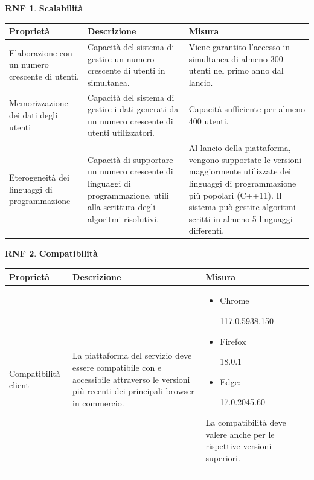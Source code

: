 \documentclass[11pt, a4paper]{article}
\theoremstyle{definition} %
\newtheorem{nonfuncreq}{RNF} %
\begin{document}
\begin{nonfuncreq}
\textbf{Scalabilità }
\begin{center}
    \footnotesize
    \begin{tabularx}{\textwidth}{|X||X||X|}
        \hline
        \cellcolor{red!70}Proprietà & \cellcolor{red!70}Descrizione & \cellcolor{red!70}Misura\\
        \hline
        Elaborazione con un numero crescente di utenti. & Capacità del sistema di gestire un numero crescente di utenti in simultanea. & Viene garantito l'accesso in simultanea di almeno 300 utenti nel primo anno dal lancio.\\
        \hline
        Memorizzazione dei dati degli utenti & Capacità del sistema di gestire i dati generati da un numero crescente di utenti utilizzatori. & Capacità sufficiente per almeno 400 utenti.\\
        \hline
        Eterogeneità dei linguaggi di programmazione & Capacità di supportare un numero crescente di linguaggi di programmazione, utili alla scrittura degli algoritmi risolutivi. & Al lancio della piattaforma, vengono supportate le versioni maggiormente utilizzate dei linguaggi di programmazione più popolari (C++11). Il sistema può gestire algoritmi scritti in almeno 5 linguaggi differenti.\\
        \hline
    \end{tabularx}
\end{center}
\end{nonfuncreq}

\begin{nonfuncreq}
    \textbf{Compatibilità }
    \begin{center}
        \footnotesize
        \begin{tabularx}{\textwidth}{|X||X||X|}
            \hline
            \cellcolor{red!70}Proprietà & \cellcolor{red!70}Descrizione & \cellcolor{red!70}Misura\\
            \hline
            Compatibilità client & La piattaforma del servizio deve essere compatibile con e accessibile attraverso le versioni più recenti dei principali browser in commercio. &
            \begin{itemize}
                \item Chrome

                117.0.5938.150
                \item Firefox

                18.0.1
                \item Edge:

                17.0.2045.60
            \end{itemize}La compatibilità deve valere anche per le rispettive versioni superiori.\\
            \hline
        \end{tabularx}
    \end{center}
\end{nonfuncreq}
\end{document}
